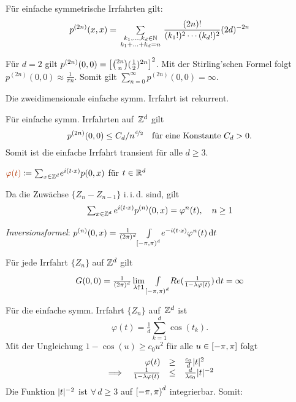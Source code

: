 \documentclass{cheat-sheet}
\newcommand{\iid}{i.\,i.\,d.} %
\newcommand{\Defn}[1]{\textcolor{DefinitionColor}{#1}}
\begin{document}
\begin{bem}
  Für einfache symmetrische Irrfahrten gilt:
  \[
    p^{(2n)}(x, x) = \qquad \sum_{\mathclap{\substack{k_1, \ldots, k_d \in \N \\ k_1 + \ldots + k_d = n}}} \qquad \frac{(2n)!}{(k_1!)^2 \cdots (k_d!)^2} (2d)^{-2n}
  \]

  Für $d = 2$ gilt $p^{(2n)}(0, 0) = \left[ \tbinom{2n}{n} (\tfrac{1}{2})^{2n} \right]^2$.
  Mit der Stirling'schen Formel folgt $p^{(2n)}(0, 0) \approx \tfrac{1}{\pi n}$.
  Somit gilt ${\sum}_{n = 0}^\infty p^{(2n)}(0,0) = \infty$.
\end{bem}

\begin{fazit}
  Die zweidimensionale einfache symm. Irrfahrt ist rekurrent.
\end{fazit}


\begin{resultat}
  Für einfache symm. Irrfahrten auf~$\mathbb{Z}^d$ gilt
  \[
    p^{(2n)}(0,0) \leq C_d / n^{\nicefrac{d}{2}} \quad
    \text{für eine Konstante $C_d > 0$.}
  \]
  Somit ist die einfache Irrfahrt transient für alle $d \geq 3$.
\end{resultat}

\begin{defn}
  $\Defn{\varphi(t)} \coloneqq {\sum}_{x \in \Z^d} e^{i (t \cdot x)} p(0, x)$ \quad
  für $t \in \mathbb{R}^d$
\end{defn}

\begin{bem}
  Da die Zuwächse $\{ Z_n - Z_{n-1} \}$ \iid{} sind, gilt
  \[ {\sum}_{x \in \Z^d} \, e^{i (t \cdot x)} p^{(n)}(0, x) = \varphi^n(t), \quad n \geq 1 \]

  \textit{Inversionsformel}: \quad
  $p^{(n)}(0, x) = \tfrac{1}{(2 \pi)^d} {\textstyle \int\limits_{\left[ -\pi, \pi \right)^d}^{}} e^{- i (t \cdot x)} \varphi^n(t) \,\mathrm{d} t$
\end{bem}

\begin{satz}
  Für jede Irrfahrt $\{ Z_n \}$ auf $\mathbb{Z}^d$ gilt
  \[ G(0, 0) = \tfrac{1}{(2 \pi)^d} \lim_{\lambda \uparrow 1} {\textstyle \int\limits_{\left[ -\pi, \pi \right)^d}^{}} Re(\tfrac{1}{1 - \lambda \varphi(t)}) \,\mathrm{d} t = \infty \]
\end{satz}

\begin{bsp}
  Für die einfache symm. Irrfahrt $\{ Z_n \}$ auf~$\mathbb{Z}^d$ ist
  \[
    \varphi(t) = \tfrac{1}{d} {\sum}_{k=1}^d \cos(t_k).
  \]
  Mit der Ungleichung $1 - \cos(u) \geq c_0 u^2$ für alle $u \in \left[ - \pi, \pi \right]$ folgt
  \[
    \begin{array}{r r c l}
      & \varphi(t) &\geq& \tfrac{c_0}{d} \lvert t\rvert^2 \\
      \implies & \tfrac{1}{1 - \lambda \varphi(t)} &\leq& \tfrac{d}{\lambda c_0} \lvert t\rvert^{-2}
    \end{array}
  \]
  Die Funktion $\lvert t\rvert^{-2}$ ist $\forall \, d \geq 3$ auf $\left[ -\pi, \pi \right)^d$ integrierbar.
  Somit:
\end{bsp}
\end{document}
